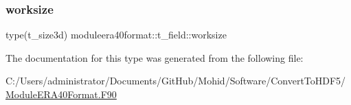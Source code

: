 \mbox{\label{structmoduleera40format_1_1t__field_ae55cb1e0e1938db3ed44e6ccff526f33}} 
\subsubsection{\texorpdfstring{worksize}{worksize}}
{\footnotesize\ttfamily type(t\+\_\+size3d) moduleera40format\+::t\+\_\+field\+::worksize\hspace{0.3cm}{\ttfamily [private]}}



The documentation for this type was generated from the following file\+:\begin{DoxyCompactItemize}
\item 
C\+:/\+Users/administrator/\+Documents/\+Git\+Hub/\+Mohid/\+Software/\+Convert\+To\+H\+D\+F5/\mbox{\hyperlink{_module_e_r_a40_format_8_f90}{Module\+E\+R\+A40\+Format.\+F90}}\end{DoxyCompactItemize}
